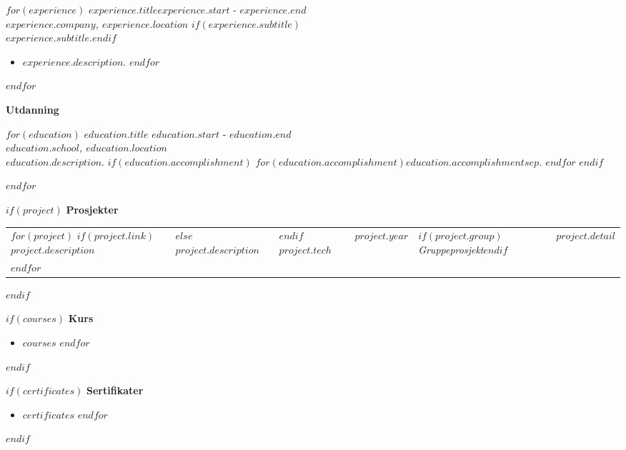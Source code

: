 \documentclass[]{$documentclass$}
\newcommand\mytitle[1]{\vspace{5mm}\textbf{\Large #1}\par\vspace{5pt}}
\def\titleeducation{Education}
\def\titleprojects{Projects}
\def\titlecourses{Courses}
\def\titlecertificates{Certificates}
\def\groupproject{Group Project}
\def\titleeducation{Utdanning}
\def\titleprojects{Prosjekter}
\def\titlecourses{Kurs}
\def\titlecertificates{Sertifikater}
\def\groupproject{Gruppeprosjekt}
\begin{document}
{    $for(experience)$
        \textbf{$experience.title$}\hfill $experience.start$ - $experience.end$\\
        \textit{$experience.company$, $experience.location$}
        $if(experience.subtitle)$\\$experience.subtitle$.$endif$
        \begin{itemize}
        $for(experience.description)$
            \item $experience.description$.
        $endfor$
        \end{itemize}
        \par\vspace{\itemspacing}
    $endfor$
    \par\vspace{-\itemspacing}

    \mytitle{\titleeducation}
    $for(education)$
        \textbf{$education.title$} \hfill $education.start$ - $education.end$\\
        \textit{$education.school$, $education.location$}\\
        $education.description$.
        $if(education.accomplishment)$
        \textit{$for(education.accomplishment)$$education.accomplishment$$sep$. $endfor$}
        $endif$
        \par\vspace{\itemspacing}
    $endfor$
    \par\vspace{-\itemspacing}

    $if(project)$
    \mytitle{\titleprojects}
    \begin{tabular}{@{\hspace{0pt}}lllll}
        $for(project)$
            $if(project.link)$
                \href{$project.link$}{$project.description$} &
            $else$
                $project.description$ & 
            $endif$
            \texttt{$project.tech$} & 
            $project.year$ & 
            $if(project.group)$\textit{\groupproject}$endif$ &
            \textit{$project.detail$}\\
        $endfor$
    \end{tabular}
    $endif$

    \begin{minipage}[t]{.49\textwidth}
        $if(courses)$
        \mytitle{\titlecourses}
        \begin{itemize}
        $for(courses)$
            \item $courses$
        $endfor$
        \end{itemize}
        $endif$
    \end{minipage}\hfill
    \begin{minipage}[t]{.49\textwidth}
        $if(certificates)$
        \mytitle{\titlecertificates}
        \begin{itemize}
        $for(certificates)$
            \item $certificates$
        $endfor$
        \end{itemize}
        $endif$
    \end{minipage}

}
\end{document}
